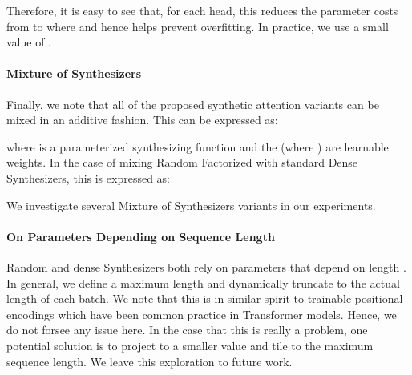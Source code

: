 \documentclass{article} \usepackage{iclr2021_conference,times}
\begin{document}
Therefore, it is easy to see that, for each head, this reduces the parameter costs from  to  where  and hence helps prevent overfitting. In practice, we use a small value of . 



\paragraph{Mixture of Synthesizers} Finally, we note that all of the proposed synthetic attention variants can be mixed in an additive fashion. This can be expressed as:

where  is a parameterized synthesizing function and the  (where ) are learnable weights. In the case of mixing Random Factorized with standard Dense Synthesizers, this is expressed as:

We investigate several Mixture of Synthesizers variants in our experiments.
\paragraph{On Parameters Depending on Sequence Length}
Random and dense Synthesizers both rely on parameters that depend on length . In general, we define a maximum length and dynamically truncate to the actual length of each batch. We note that this is in similar spirit to trainable positional encodings which have been common practice in Transformer models. Hence, we do not forsee any issue here. In the case that this is really a problem, one potential solution is to project to a smaller value  and tile  to the maximum sequence length. We leave this exploration to future work.
\end{document}
